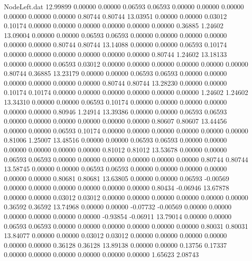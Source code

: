 \begin{filecontents}{NodeLeft.dat}
  12.99899    0.00000    0.00000     0.06593    0.06593    0.00000    0.00000    0.00000    0.00000    0.00000    0.00000    0.80744    0.80744
  13.03951    0.00000    0.00000     0.03012    0.10174    0.00000    0.00000    0.00000    0.00000    0.00000    0.00000    0.36885    1.24602
  13.09004    0.00000    0.00000     0.06593    0.06593    0.00000    0.00000    0.00000    0.00000    0.00000    0.00000    0.80744    0.80744
  13.14088    0.00000    0.00000     0.06593    0.10174    0.00000    0.00000    0.00000    0.00000    0.00000    0.00000    0.80744    1.24602
  13.18133    0.00000    0.00000     0.06593    0.03012    0.00000    0.00000    0.00000    0.00000    0.00000    0.00000    0.80744    0.36885
  13.23179    0.00000    0.00000     0.06593    0.06593    0.00000    0.00000    0.00000    0.00000    0.00000    0.00000    0.80744    0.80744
  13.28230    0.00000    0.00000     0.10174    0.10174    0.00000    0.00000    0.00000    0.00000    0.00000    0.00000    1.24602    1.24602
  13.34310    0.00000    0.00000     0.06593    0.10174    0.00000    0.00000    0.00000    0.00000    0.00000    0.00000    0.80946    1.24914
  13.39386    0.00000    0.00000     0.06593    0.06593    0.00000    0.00000    0.00000    0.00000    0.00000    0.00000    0.80607    0.80607
  13.44456    0.00000    0.00000     0.06593    0.10174    0.00000    0.00000    0.00000    0.00000    0.00000    0.00000    0.81006    1.25007
  13.48516    0.00000    0.00000     0.06593    0.06593    0.00000    0.00000    0.00000    0.00000    0.00000    0.00000    0.81012    0.81012
  13.53678    0.00000    0.00000     0.06593    0.06593    0.00000    0.00000    0.00000    0.00000    0.00000    0.00000    0.80744    0.80744
  13.58745    0.00000    0.00000     0.06593    0.06593    0.00000    0.00000    0.00000    0.00000    0.00000    0.00000    0.80681    0.80681
  13.63805    0.00000    0.00000     0.06593   -0.00569    0.00000    0.00000    0.00000    0.00000    0.00000    0.00000    0.80434   -0.06946
  13.67878    0.00000    0.00000     0.03012    0.03012    0.00000    0.00000    0.00000    0.00000    0.00000    0.00000    0.36592    0.36592
  13.74968    0.00000    0.00000    -0.07732   -0.00569    0.00000    0.00000    0.00000    0.00000    0.00000    0.00000   -0.93854   -0.06911
  13.79014    0.00000    0.00000     0.06593    0.06593    0.00000    0.00000    0.00000    0.00000    0.00000    0.00000    0.80031    0.80031
  13.84077    0.00000    0.00000     0.03012    0.03012    0.00000    0.00000    0.00000    0.00000    0.00000    0.00000    0.36128    0.36128
  13.89138    0.00000    0.00000     0.13756    0.17337    0.00000    0.00000    0.00000    0.00000    0.00000    0.00000    1.65623    2.08743

\end{filecontents}
